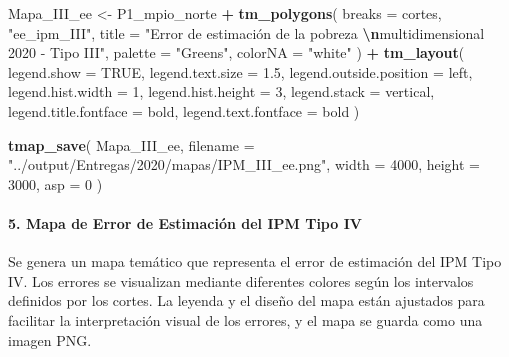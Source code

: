 \documentclass[
  12pt,
]{book}
\newenvironment{Shaded}{\begin{snugshade}}{\end{snugshade}}
\newcommand{\AttributeTok}[1]{\textcolor[rgb]{0.13,0.29,0.53}{#1}}
\newcommand{\ConstantTok}[1]{\textcolor[rgb]{0.56,0.35,0.01}{#1}}
\newcommand{\DecValTok}[1]{\textcolor[rgb]{0.00,0.00,0.81}{#1}}
\newcommand{\FloatTok}[1]{\textcolor[rgb]{0.00,0.00,0.81}{#1}}
\newcommand{\FunctionTok}[1]{\textcolor[rgb]{0.13,0.29,0.53}{\textbf{#1}}}
\newcommand{\NormalTok}[1]{#1}
\newcommand{\OtherTok}[1]{\textcolor[rgb]{0.56,0.35,0.01}{#1}}
\newcommand{\SpecialCharTok}[1]{\textcolor[rgb]{0.81,0.36,0.00}{\textbf{#1}}}
\newcommand{\StringTok}[1]{\textcolor[rgb]{0.31,0.60,0.02}{#1}}
\begin{document}
\begin{Shaded}
\begin{Highlighting}[]
\NormalTok{Mapa\_III\_ee }\OtherTok{\textless{}{-}}
\NormalTok{  P1\_mpio\_norte }\SpecialCharTok{+} \FunctionTok{tm\_polygons}\NormalTok{(}
    \AttributeTok{breaks =}\NormalTok{ cortes,}
    \StringTok{"ee\_ipm\_III"}\NormalTok{,}
    \AttributeTok{title =} \StringTok{"Error de estimación de la pobreza }\SpecialCharTok{\textbackslash{}n}\StringTok{multidimensional 2020 {-} Tipo III"}\NormalTok{,}
    \AttributeTok{palette =} \StringTok{"Greens"}\NormalTok{,}
    \AttributeTok{colorNA =} \StringTok{"white"}
\NormalTok{  ) }\SpecialCharTok{+} \FunctionTok{tm\_layout}\NormalTok{(}
    \AttributeTok{legend.show =} \ConstantTok{TRUE}\NormalTok{,}
    \AttributeTok{legend.text.size =} \FloatTok{1.5}\NormalTok{,}
    \AttributeTok{legend.outside.position =} \StringTok{\textquotesingle{}left\textquotesingle{}}\NormalTok{,}
    \AttributeTok{legend.hist.width =} \DecValTok{1}\NormalTok{,}
    \AttributeTok{legend.hist.height =} \DecValTok{3}\NormalTok{,}
    \AttributeTok{legend.stack =} \StringTok{\textquotesingle{}vertical\textquotesingle{}}\NormalTok{,}
    \AttributeTok{legend.title.fontface =} \StringTok{\textquotesingle{}bold\textquotesingle{}}\NormalTok{,}
    \AttributeTok{legend.text.fontface =} \StringTok{\textquotesingle{}bold\textquotesingle{}}
\NormalTok{  )}

\FunctionTok{tmap\_save}\NormalTok{(}
\NormalTok{  Mapa\_III\_ee,}
  \AttributeTok{filename =} \StringTok{"../output/Entregas/2020/mapas/IPM\_III\_ee.png"}\NormalTok{,}
  \AttributeTok{width =} \DecValTok{4000}\NormalTok{,}
  \AttributeTok{height =} \DecValTok{3000}\NormalTok{,}
  \AttributeTok{asp =} \DecValTok{0}
\NormalTok{)}
\end{Highlighting}
\end{Shaded}

\hypertarget{mapa-de-error-de-estimaciuxf3n-del-ipm-tipo-iv}{%
\paragraph*{5. Mapa de Error de Estimación del IPM Tipo IV}\label{mapa-de-error-de-estimaciuxf3n-del-ipm-tipo-iv}}

Se genera un mapa temático que representa el error de estimación del IPM Tipo IV. Los errores se visualizan mediante diferentes colores según los intervalos definidos por los cortes. La leyenda y el diseño del mapa están ajustados para facilitar la interpretación visual de los errores, y el mapa se guarda como una imagen PNG.
\end{document}

